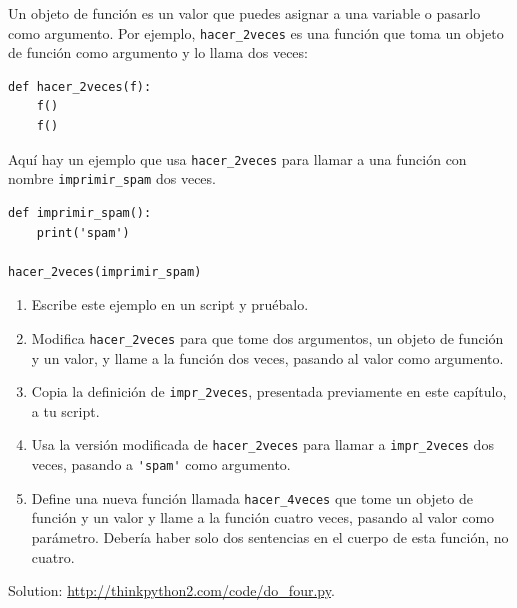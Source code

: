 \documentclass[10pt]{book}
\begin{document}
\begin{exercise}

Un objeto de función es un valor que puedes asignar a una variable o
pasarlo como argumento.  Por ejemplo, \verb"hacer_2veces" es una función
que toma un objeto de función como argumento y lo llama dos veces:

\begin{verbatim}
def hacer_2veces(f):
    f()
    f()
\end{verbatim}

Aquí hay un ejemplo que usa \verb"hacer_2veces" para llamar a una función
con nombre \verb"imprimir_spam" dos veces.

\begin{verbatim}
def imprimir_spam():
    print('spam')

hacer_2veces(imprimir_spam)
\end{verbatim}

\begin{enumerate}

\item Escribe este ejemplo en un script y pruébalo.

\item Modifica \verb"hacer_2veces" para que tome dos argumentos, un
objeto de función y un valor, y llame a la función dos veces,
pasando al valor como argumento.

\item Copia la definición de
\verb"impr_2veces", presentada previamente en este capítulo, a tu script.

\item Usa la versión modificada de \verb"hacer_2veces" para llamar a
\verb"impr_2veces" dos veces, pasando a \verb"'spam'" como argumento.

\item Define una nueva función llamada
\verb"hacer_4veces" que tome un objeto de función y un valor
y llame a la función cuatro veces, pasando al valor
como parámetro.  Debería haber solo
dos sentencias en el cuerpo de esta función, no cuatro.

\end{enumerate}

Solution: \url{http://thinkpython2.com/code/do_four.py}.

\end{exercise}
\end{document}
